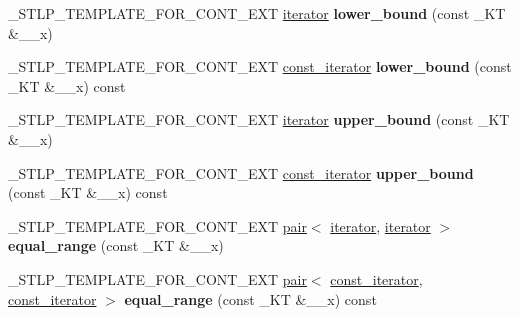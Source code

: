 \begin{DoxyCompactItemize}
\item 
\mbox{\label{class___rb__tree_a036f51cdd0a00c3296335338508ecb10}} 
\+\_\+\+S\+T\+L\+P\+\_\+\+T\+E\+M\+P\+L\+A\+T\+E\+\_\+\+F\+O\+R\+\_\+\+C\+O\+N\+T\+\_\+\+E\+XT \hyperlink{struct___rb__tree__iterator}{iterator} {\bfseries lower\+\_\+bound} (const \+\_\+\+KT \&\+\_\+\+\_\+x)
\item 
\mbox{\label{class___rb__tree_a0282d9c49edc5330ceb352cdf0cfb0e1}} 
\+\_\+\+S\+T\+L\+P\+\_\+\+T\+E\+M\+P\+L\+A\+T\+E\+\_\+\+F\+O\+R\+\_\+\+C\+O\+N\+T\+\_\+\+E\+XT \hyperlink{struct___rb__tree__iterator}{const\+\_\+iterator} {\bfseries lower\+\_\+bound} (const \+\_\+\+KT \&\+\_\+\+\_\+x) const
\item 
\mbox{\label{class___rb__tree_a6924090c59ac58fc25279c31b6413282}} 
\+\_\+\+S\+T\+L\+P\+\_\+\+T\+E\+M\+P\+L\+A\+T\+E\+\_\+\+F\+O\+R\+\_\+\+C\+O\+N\+T\+\_\+\+E\+XT \hyperlink{struct___rb__tree__iterator}{iterator} {\bfseries upper\+\_\+bound} (const \+\_\+\+KT \&\+\_\+\+\_\+x)
\item 
\mbox{\label{class___rb__tree_a21064bcd2d2c007a4387159073ce3d73}} 
\+\_\+\+S\+T\+L\+P\+\_\+\+T\+E\+M\+P\+L\+A\+T\+E\+\_\+\+F\+O\+R\+\_\+\+C\+O\+N\+T\+\_\+\+E\+XT \hyperlink{struct___rb__tree__iterator}{const\+\_\+iterator} {\bfseries upper\+\_\+bound} (const \+\_\+\+KT \&\+\_\+\+\_\+x) const
\item 
\mbox{\label{class___rb__tree_a3fe62161edfd2ac095d1c825b6bcf42a}} 
\+\_\+\+S\+T\+L\+P\+\_\+\+T\+E\+M\+P\+L\+A\+T\+E\+\_\+\+F\+O\+R\+\_\+\+C\+O\+N\+T\+\_\+\+E\+XT \hyperlink{structpair}{pair}$<$ \hyperlink{struct___rb__tree__iterator}{iterator}, \hyperlink{struct___rb__tree__iterator}{iterator} $>$ {\bfseries equal\+\_\+range} (const \+\_\+\+KT \&\+\_\+\+\_\+x)
\item 
\mbox{\label{class___rb__tree_a0195db7b12403526c29a41407d898cf7}} 
\+\_\+\+S\+T\+L\+P\+\_\+\+T\+E\+M\+P\+L\+A\+T\+E\+\_\+\+F\+O\+R\+\_\+\+C\+O\+N\+T\+\_\+\+E\+XT \hyperlink{structpair}{pair}$<$ \hyperlink{struct___rb__tree__iterator}{const\+\_\+iterator}, \hyperlink{struct___rb__tree__iterator}{const\+\_\+iterator} $>$ {\bfseries equal\+\_\+range} (const \+\_\+\+KT \&\+\_\+\+\_\+x) const
\item 

\end{DoxyCompactItemize}
